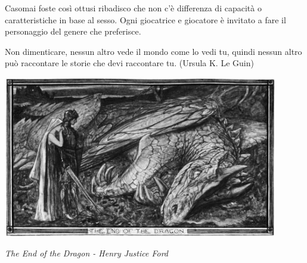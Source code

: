 \begin{giocatore}
Casomai foste così ottusi ribadisco che non c'è differenza di capacità o caratteristiche in base al sesso. Ogni giocatrice e giocatore è invitato a fare il personaggio del genere che preferisce.
\end{giocatore}

\begin{enfasi}
Non dimenticare, nessun altro vede il mondo come lo vedi tu, quindi nessun altro può raccontare le storie che devi raccontare tu. (Ursula K. Le Guin)
\end{enfasi}

\vfill

\begin{center}
\includegraphics[keepaspectratio,width=0.9\textwidth]{immagini/Dragon_by_Henry_Justice_Ford_grey.png}

\emph{The End of the Dragon - Henry Justice Ford}
\end{center}

\pagebreak

